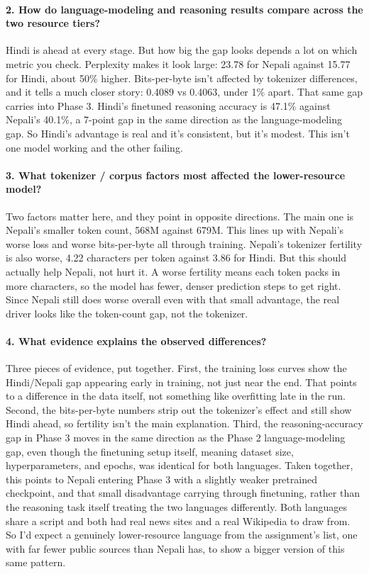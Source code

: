 \documentclass[10pt]{article}
\begin{document}
\paragraph{2. How do language-modeling and reasoning results compare across the two resource tiers?}
Hindi is ahead at every stage. But how big the gap looks depends a lot on which metric you check. Perplexity makes it look large: 23.78 for Nepali against 15.77 for Hindi, about 50\% higher. Bits-per-byte isn't affected by tokenizer differences, and it tells a much closer story: 0.4089 vs 0.4063, under 1\% apart. That same gap carries into Phase 3. Hindi's finetuned reasoning accuracy is 47.1\% against Nepali's 40.1\%, a 7-point gap in the same direction as the language-modeling gap. So Hindi's advantage is real and it's consistent, but it's modest. This isn't one model working and the other failing.

\paragraph{3. What tokenizer / corpus factors most affected the lower-resource model?}
Two factors matter here, and they point in opposite directions. The main one is Nepali's smaller token count, 568M against 679M. This lines up with Nepali's worse loss and worse bits-per-byte all through training. Nepali's tokenizer fertility is also worse, 4.22 characters per token against 3.86 for Hindi. But this should actually help Nepali, not hurt it. A worse fertility means each token packs in more characters, so the model has fewer, denser prediction steps to get right. Since Nepali still does worse overall even with that small advantage, the real driver looks like the token-count gap, not the tokenizer.

\paragraph{4. What evidence explains the observed differences?}
Three pieces of evidence, put together. First, the training loss curves show the Hindi/Nepali gap appearing early in training, not just near the end. That points to a difference in the data itself, not something like overfitting late in the run. Second, the bits-per-byte numbers strip out the tokenizer's effect and still show Hindi ahead, so fertility isn't the main explanation. Third, the reasoning-accuracy gap in Phase 3 moves in the same direction as the Phase 2 language-modeling gap, even though the finetuning setup itself, meaning dataset size, hyperparameters, and epochs, was identical for both languages. Taken together, this points to Nepali entering Phase 3 with a slightly weaker pretrained checkpoint, and that small disadvantage carrying through finetuning, rather than the reasoning task itself treating the two languages differently. Both languages share a script and both had real news sites and a real Wikipedia to draw from. So I'd expect a genuinely lower-resource language from the assignment's list, one with far fewer public sources than Nepali has, to show a bigger version of this same pattern.
\end{document}
